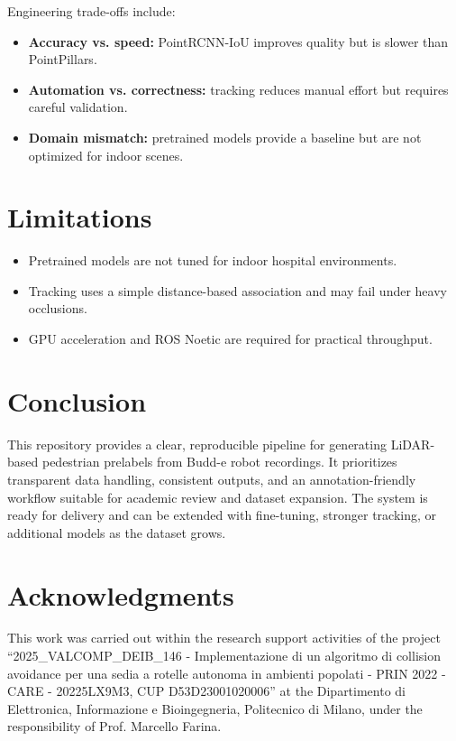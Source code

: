 \documentclass[a4paper,12pt]{article}
\begin{document}
Engineering trade-offs include:
\begin{itemize}
\item \textbf{Accuracy vs. speed:} PointRCNN-IoU improves quality but is slower than PointPillars.
\item \textbf{Automation vs. correctness:} tracking reduces manual effort but requires careful validation.
\item \textbf{Domain mismatch:} pretrained models provide a baseline but are not optimized for indoor scenes.
\end{itemize}

\section{Limitations}
\begin{itemize}
\item Pretrained models are not tuned for indoor hospital environments.
\item Tracking uses a simple distance-based association and may fail under heavy occlusions.
\item GPU acceleration and ROS Noetic are required for practical throughput.
\end{itemize}

\section{Conclusion}
This repository provides a clear, reproducible pipeline for generating LiDAR-based pedestrian prelabels from Budd-e robot recordings. It prioritizes transparent data handling, consistent outputs, and an annotation-friendly workflow suitable for academic review and dataset expansion. The system is ready for delivery and can be extended with fine-tuning, stronger tracking, or additional models as the dataset grows.

\section*{Acknowledgments}
This work was carried out within the research support activities of the project ``2025\_VALCOMP\_DEIB\_146 - Implementazione di un algoritmo di collision avoidance per una sedia a rotelle autonoma in ambienti popolati - PRIN 2022 - CARE - 20225LX9M3, CUP D53D23001020006'' at the Dipartimento di Elettronica, Informazione e Bioingegneria, Politecnico di Milano, under the responsibility of Prof. Marcello Farina.
\end{document}
